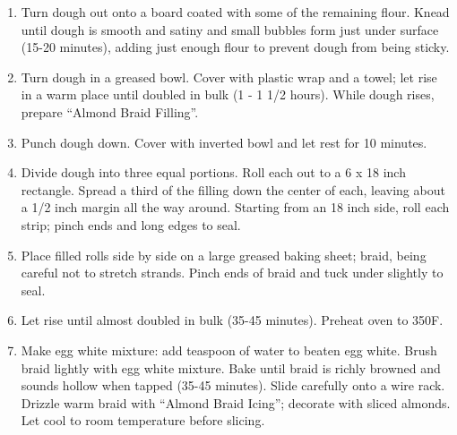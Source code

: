 \documentclass[11pt, twoside, openany]{book}
\begin{document}
\begin{minipage}[t]{\linewidth}
\begin{enumerate}
\item Turn dough out onto a board coated with some of the remaining flour. Knead until dough is smooth and satiny and small bubbles form just under surface (15-20 minutes), adding just enough flour to prevent dough from being sticky.
\item Turn dough in a greased bowl. Cover with plastic wrap and a towel; let rise in a warm place until doubled in bulk (1 - 1 1/2 hours). While dough rises, prepare ``Almond Braid Filling''.
\item Punch dough down. Cover with inverted bowl and let rest for 10 minutes.
\item Divide dough into three equal portions. Roll each out to a 6 x 18 inch rectangle. Spread a third of the filling down the center of each, leaving about a 1/2 inch margin all the way around. Starting from an 18 inch side, roll each strip; pinch ends and long edges to seal.
\item Place filled rolls side by side on a large greased baking sheet; braid, being careful not to stretch strands. Pinch ends of braid and tuck under slightly to seal.
\item Let rise until almost doubled in bulk (35-45 minutes). Preheat oven to 350F.
\item Make egg white mixture: add teaspoon of water to beaten egg white. Brush braid lightly with egg white mixture. Bake until braid is richly browned and sounds hollow when tapped (35-45 minutes). Slide carefully onto a wire rack. Drizzle warm braid with ``Almond Braid Icing''; decorate with sliced almonds. Let cool to room temperature before slicing.
\end{enumerate}
\end{minipage}\vspace{8mm}
\end{document}
